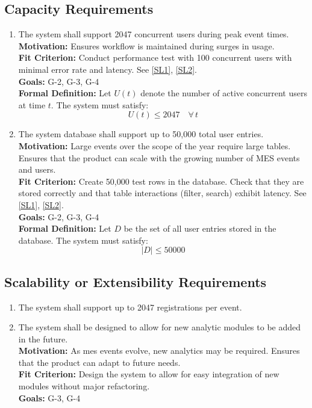\documentclass[12pt]{article}
\begin{document}
\subsection{Capacity Requirements}
\begin{enumerate}[label=\bfseries CR-\arabic*:, wide=0pt, leftmargin=*, ref=\bfseries CR-\arabic*]
  \item \label{CR1} The system shall support 2047 concurrent users during peak event times.\\
  {\bf Motivation:} Ensures workflow is maintained during surges in usage.\\
  {\bf Fit Criterion:} Conduct performance test with 100 concurrent users with minimal error rate and latency. See \ref{SL1}, \ref{SL2}.\\
  {\bf Goals:} G-2, G-3, G-4 \\
  {\bf Formal Definition:} Let $U(t)$ denote the number of active concurrent users at time $t$. 
  The system must satisfy:
  \[
    U(t) \leq 2047 \quad \forall\, t
  \]
  \item \label{CR2} The system database shall support up to 50,000 total user entries.\\
  {\bf Motivation:} Large events over the scope of the year require large tables. Ensures that the product can scale with the growing number of MES events and users.\\
  {\bf Fit Criterion:} Create 50,000 test rows in the database. Check that they are stored correctly and that table interactions (filter, search) exhibit latency. See \ref{SL1}, \ref{SL2}.\\
  {\bf Goals:} G-2, G-3, G-4\\
  {\bf Formal Definition:} Let $D$ be the set of all user entries stored in the database. The 
  system must satisfy:
  \[
    |D| \leq 50000
  \]
\end{enumerate}

\subsection{Scalability or Extensibility Requirements}
\begin{enumerate}[label=\bfseries SE-\arabic*:, wide=0pt, leftmargin=*, ref=\bfseries SE-\arabic*]
  \item \label{SE1} The system shall support up to 2047 registrations per event.
  \item \label{SE2} The system shall be designed to allow for new analytic modules to be added in the future.\\
  {\bf Motivation:} As \Gls{mes} events evolve, new analytics may be required. Ensures that the product can adapt to future needs.\\
  {\bf Fit Criterion:} Design the system to allow for easy integration of new modules without major refactoring.\\
  {\bf Goals:} G-3, G-4
\end{enumerate}
\end{document}
